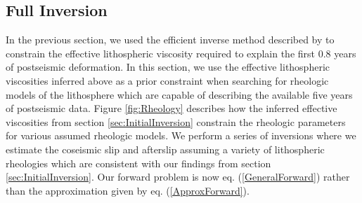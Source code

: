 \documentclass[1p]{elsarticle}
\begin{document}
\subsection{Full Inversion}\label{sec:FullInversion} 

In the previous section, we used the efficient inverse method described by \citet{Hines2015} to constrain the effective lithospheric viscosity required to explain the first 0.8 years of postseismic deformation. In this section, we use the effective lithospheric viscosities inferred above as a prior constraint when searching for rheologic models of the lithosphere which are capable of describing the available five years of postseismic data.  Figure \ref{fig:Rheology} describes how the inferred effective viscosities from section \ref{sec:InitialInversion} constrain the rheologic parameters for various assumed rheologic models. We perform a series of inversions where we estimate the coseismic slip and afterslip assuming a variety of lithospheric rheologies which are consistent with our findings from section \ref{sec:InitialInversion}.  Our forward problem is now eq. (\ref{GeneralForward}) rather than the approximation given by eq. (\ref{ApproxForward}).

\end{document}
